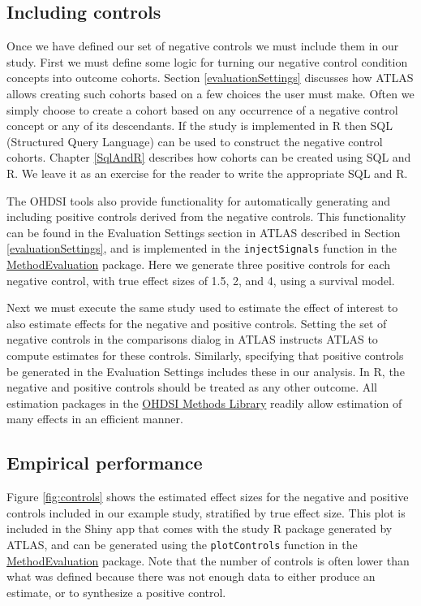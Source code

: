 \documentclass[11pt]{book}
\begin{document}
\subsection{Including controls}\label{including-controls}

Once we have defined our set of negative controls we must include them
in our study. First we must define some logic for turning our negative
control condition concepts into outcome cohorts. Section
\ref{evaluationSettings} discusses how ATLAS allows creating such
cohorts based on a few choices the user must make. Often we simply
choose to create a cohort based on any occurrence of a negative control
concept or any of its descendants. If the study is implemented in R then
SQL (Structured Query Language) can be used to construct the negative
control cohorts. Chapter \ref{SqlAndR} describes how cohorts can be
created using SQL and R. We leave it as an exercise for the reader to
write the appropriate SQL and R.

The OHDSI tools also provide functionality for automatically generating
and including positive controls derived from the negative controls. This
functionality can be found in the Evaluation Settings section in ATLAS
described in Section \ref{evaluationSettings}, and is implemented in the
\texttt{injectSignals} function in the
\href{https://ohdsi.github.io/MethodEvaluation/}{MethodEvaluation}
package. Here we generate three positive controls for each negative
control, with true effect sizes of 1.5, 2, and 4, using a survival
model.

Next we must execute the same study used to estimate the effect of
interest to also estimate effects for the negative and positive
controls. Setting the set of negative controls in the comparisons dialog
in ATLAS instructs ATLAS to compute estimates for these controls.
Similarly, specifying that positive controls be generated in the
Evaluation Settings includes these in our analysis. In R, the negative
and positive controls should be treated as any other outcome. All
estimation packages in the
\href{https://ohdsi.github.io/MethodsLibrary/}{OHDSI Methods Library}
readily allow estimation of many effects in an efficient manner.

\subsection{Empirical performance}\label{empirical-performance}

Figure \ref{fig:controls} shows the estimated effect sizes for the
negative and positive controls included in our example study, stratified
by true effect size. This plot is included in the Shiny app that comes
with the study R package generated by ATLAS, and can be generated using
the \texttt{plotControls} function in the
\href{https://ohdsi.github.io/MethodEvaluation/}{MethodEvaluation}
package. Note that the number of controls is often lower than what was
defined because there was not enough data to either produce an estimate,
or to synthesize a positive control.
\end{document}

